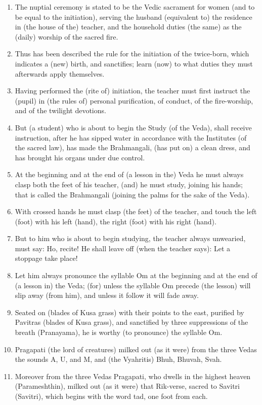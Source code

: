 \begin{enumerate}
\item The nuptial ceremony is stated to be the Vedic sacrament for women (and to be equal to the initiation), serving the husband (equivalent to) the residence in (the house of the) teacher, and the household duties (the same) as the (daily) worship of the sacred fire.
\item Thus has been described the rule for the initiation of the twice-born, which indicates a (new) birth, and sanctifies; learn (now) to what duties they must afterwards apply themselves.
\item Having performed the (rite of) initiation, the teacher must first instruct the (pupil) in (the rules of) personal purification, of conduct, of the fire-worship, and of the twilight devotions.
\item But (a student) who is about to begin the Study (of the Veda), shall receive instruction, after he has sipped water in accordance with the Institutes (of the sacred law), has made the Brahmangali, (has put on) a clean dress, and has brought his organs under due control.
\item At the beginning and at the end of (a lesson in the) Veda he must always clasp both the feet of his teacher, (and) he must study, joining his hands; that is called the Brahmangali (joining the palms for the sake of the Veda).
\item With crossed hands he must clasp (the feet) of the teacher, and touch the left (foot) with his left (hand), the right (foot) with his right (hand).
\item But to him who is about to begin studying, the teacher always unwearied, must say: Ho, recite! He shall leave off (when the teacher says): Let a stoppage take place!
\item Let him always pronounce the syllable Om at the beginning and at the end of (a lesson in) the Veda; (for) unless the syllable Om precede (the lesson) will slip away (from him), and unless it follow it will fade away.
\item Seated on (blades of Kusa grass) with their points to the east, purified by Pavitras (blades of Kusa grass), and sanctified by three suppressions of the breath (Pranayama), he is worthy (to pronounce) the syllable Om.
\item Pragapati (the lord of creatures) milked out (as it were) from the three Vedas the sounds A, U, and M, and (the Vyahritis) Bhuh, Bhuvah, Svah.
\item Moreover from the three Vedas Pragapati, who dwells in the highest heaven (Parameshthin), milked out (as it were) that Rik-verse, sacred to Savitri (Savitri), which begins with the word tad, one foot from each.

\end{enumerate}
